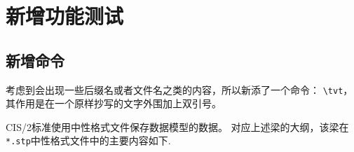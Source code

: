 \documentclass[../Main/thesis.tex]{subfiles}
\begin{document}
\chapter{新增功能测试}
\label{chp:newFunc}

\section{新增命令}
\label{sec:newfunction}

考虑到会出现一些后缀名或者文件名之类的内容，所以新添了一个命令：
\verb|\tvt|，
其作用是在一个原样抄写的文字外围加上双引号。

CIS/2标准使用中性格式文件保存数据模型的数据。
对应上述梁的大纲，该梁在\texttt{*.stp}中性格式文件中的主要内容如下.
\end{document}
